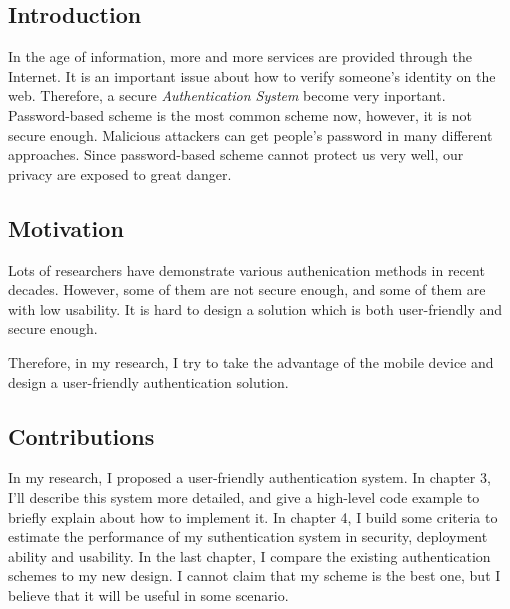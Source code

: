 
\begin{CJK}{Bg5}{bsmi}



\chapter{Introduction}

In the age of information, more and more services are provided through the Internet. It is an important issue about how to verify someone's identity on the web. Therefore, a secure \emph{Authentication System} become very inportant. Password-based scheme is the most common scheme now, however, it is not secure enough. Malicious attackers can get people's password in many different approaches. Since password-based scheme cannot protect us very well, our privacy are exposed to great danger.

\section{Motivation}

Lots of researchers have demonstrate various authenication methods in recent decades. However, some of them are not secure enough, and some of them are with low usability. It is hard to design a solution which is both user-friendly and secure enough.

Therefore, in my research, I try to take the advantage of the mobile device and design a user-friendly authentication solution. 

\section{Contributions}

In my research, I proposed a user-friendly authentication system. In chapter 3, I'll describe this system more detailed, and give a high-level code example to briefly explain about how to implement it. In chapter 4, I build some criteria to estimate the performance of my suthentication system in security, deployment ability and usability. In the last chapter, I compare the existing authentication schemes to my new design. I cannot claim that my scheme is the best one, but I believe that it will be useful in some scenario. 

\end{CJK}
